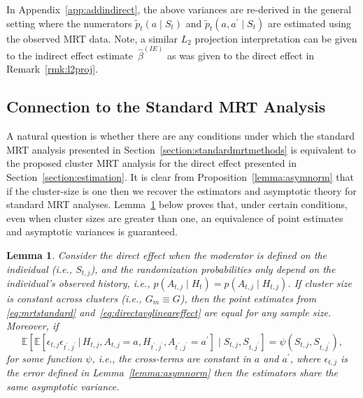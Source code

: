 \documentclass[12pt]{article}
\def\E{\mathbb{E}}
\def\given{\, | \,}
\newtheorem{lemma}[thm]{Lemma}
\begin{document}
In Appendix~\ref{app:addindirect}, the above variances are re-derived in the general setting where the numerators $\tilde p_t (a \mid S_t)$ and $\tilde p_t (a, a^\prime \mid S_t)$ are estimated using the observed MRT data.  Note, a similar $L_2$ projection interpretation can be given to the indirect effect estimate~$\hat \beta^{(IE)}$ as was given to the direct effect in Remark~\ref{rmk:l2proj}.


\subsection{Connection to the Standard MRT Analysis}
\label{section:samesies}
A natural question is whether there are any conditions under which the standard MRT analysis presented in Section~\ref{section:standardmrtmethods} is equivalent to the proposed cluster MRT analysis for the direct effect presented in Section~\ref{section:estimation}. It is clear from Proposition~\ref{lemma:asymnorm} that if the cluster-size is one then we recover the estimators and asymptotic theory for standard MRT analyses.  Lemma~\ref{lemma:samesies} below proves that, under certain conditions, even when cluster sizes are greater than one, an equivalence of point estimates and asymptotic variances is guaranteed.

\begin{lemma}
\label{lemma:samesies}
Consider the direct effect when the moderator is defined on the individual (i.e., $S_{t,j}$), and the randomization probabilities only depend on the individual's observed history, i.e., $p(A_{t,j} \mid H_t) = p(A_{t,j} \mid H_{t,j})$.  If cluster size is constant across clusters (i.e., $G_m \equiv G$), then the point estimates from \eqref{eq:mrtstandard} and~\eqref{eq:directavglineareffect} are equal for any sample size. Moreover, if
\begin{equation}
    \label{eq:samesiescondition}
    \E \left[ \E \left[ \epsilon_{t,j} \epsilon_{t^\prime, j^\prime} \given H_{t,j}, A_{t,j}=a, H_{t^\prime,j^\prime}, A_{t^\prime,j^\prime} = a^\prime \right] \mid S_{t,j}, S_{t,j^\prime} \right] = \psi(S_{t,j}, S_{t,j^\prime}),
\end{equation}
for some function $\psi$, i.e., the cross-terms are constant in $a$ and $a^\prime$, where $\epsilon_{t,j}$ is the error defined in Lemma~\ref{lemma:asymnorm} then the estimators share the same asymptotic variance.
\end{lemma}
\end{document}
